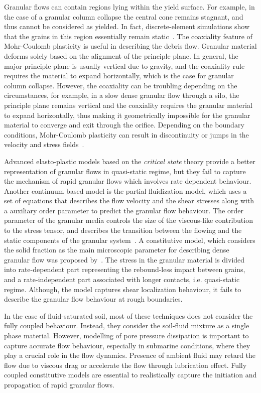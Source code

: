 Granular flows can contain regions lying within the yield surface. For example, 
in the case of a granular column collapse the central cone remains stagnant, 
and thus cannot be considered as yielded. In fact, discrete-element simulations 
show that the grains in this region essentially remain 
static~\citep{Staron2005}. The coaxiality feature of Mohr-Coulomb plasticity is 
useful in describing the debris flow. Granular material deforms solely based on 
the alignment of the principle plane. In general, the major principle plane is 
usually vertical due to gravity, and the coaxiality rule requires the material 
to expand horizontally, which is the case for granular column collapse. 
However, the coaxiality can be troubling depending on the circumstances, for 
example, in a slow dense granular flow through a silo, the principle plane 
remains vertical and the coaxiality requires the granular material to expand 
horizontally, thus making it geometrically impossible for the granular material 
to converge and exit through the orifice. Depending on the boundary conditions, 
Mohr-Coulomb plasticity can result in discontinuity or jumps in the velocity 
and stress fields~\citep{Rycroft2006}. 

Advanced elasto-plastic models based on the \textit{critical state} theory
provide a better representation of granular 
flows in quasi-static regime, but they fail to capture the mechanism of rapid 
granular flows which involves rate dependent behaviour. Another continuum based 
model is the partial fluidization model, which uses a set of equations that 
describes the flow velocity and the shear stresses along with a auxiliary order 
parameter to predict the granular flow behaviour. The order parameter of the 
granular media controls the size of the viscous-like contribution to the stress 
tensor, and describes the transition between the flowing and the static 
components of the granular system~\citep{Aranson2001}. A constitutive model, 
which considers the solid fraction as the main microscopic parameter for 
describing dense granular flow was proposed by~\citet{Josserand2004}. The 
stress in the granular material is divided into rate-dependent part 
representing the rebound-less impact between grains, and a rate-independent 
part associated with longer contacts, i.e. quasi-static regime. Although, the 
model captures shear localization behaviour, it fails to describe the granular 
flow behaviour at rough boundaries.

In the case of fluid-saturated soil, most of these techniques does not consider 
the fully coupled behaviour. Instead, they consider the soil-fluid mixture as a 
single phase material. However, modelling of pore pressure dissipation is 
important to capture accurate flow behaviour, especially in submarine 
conditions, where they play a crucial role in the flow dynamics. Presence of 
ambient fluid may retard the flow due to viscous drag or accelerate the flow 
through lubrication effect. Fully coupled constitutive models are essential to 
realistically capture the initiation and propagation of rapid granular flows.

